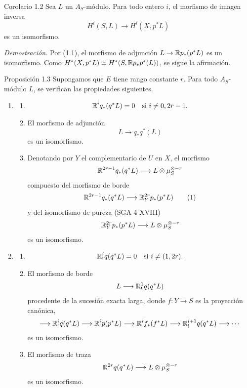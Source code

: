 \begin{statement}{Corolario 1.2}
Sea $L$ un $A_S$-módulo. Para todo entero $i$, el morfismo de imagen inversa
\[
H^i(S,L)\longrightarrow H^i(X,p^*L)
\]
es un isomorfismo.
\end{statement}

\emph{Demostración.} Por (1.1), el morfismo de adjunción $L\to \mathbb{R} p_*(p^*L)$ es un isomorfismo. Como $H^*(X,p^*L)\simeq H^*(S,\mathbb{R} p_*p^*(L))$, se sigue la afirmación.

\begin{statement}{Proposición 1.3}
Supongamos que $E$ tiene rango constante $r$. Para todo $A_S$-módulo $L$, se verifican las propiedades siguientes.
\begin{enumerate}[label=(\roman*)]
\item
\begin{enumerate}[label=\alph*)]
\item
\[
\mathbb{R}^i q_*(q^*L)=0\quad\text{si }i\ne 0,2r-1.
\]
\item El morfismo de adjunción
\[
L\longrightarrow q_*q^*(L)
\]
es un isomorfismo.
\item Denotando por $Y$ el complementario de $U$ en $X$, el morfismo
\[
\mathbb{R}^{2r-1}q_*(q^*L)\longrightarrow L\otimes\mu_S^{\otimes -r}
\]
compuesto del morfismo de borde
\[
\mathbb{R}^{2r-1}q_*(q^*L)\longrightarrow \mathbb{R}_Y^{2r}p_*(p^*L)
\tag{1}
\]
y del isomorfismo de pureza (SGA 4 XVIII)
\[
\mathbb{R}_Y^{2r}p_*(p^*L)\longrightarrow L\otimes\mu_S^{\otimes -r}
\]
es un isomorfismo.
\end{enumerate}
\item
\begin{enumerate}[label=\alph*)]
\item
\[
\mathbb{R}_!^i q(q^*L)=0\quad\text{si }i\ne (1,2r).
\]
\item El morfismo de borde
\[
L\longrightarrow \mathbb{R}_!^1 q(q^*L)
\]
procedente de la sucesión exacta larga, donde $f:Y\to S$ es la proyección canónica,
\[
\longrightarrow \mathbb{R}_!^i q(q^*L)\longrightarrow \mathbb{R}_!^i p(p^*L)
\longrightarrow \mathbb{R}^i f_*(f^*L)\longrightarrow \mathbb{R}_!^{i+1}q(q^*L)\longrightarrow\cdots
\]
es un isomorfismo.
\item El morfismo de traza
\[
\mathbb{R}^{2r}q(q^*L)\longrightarrow L\otimes\mu_S^{\otimes -r}
\]
es un isomorfismo.
\end{enumerate}
\end{enumerate}
\end{statement}
